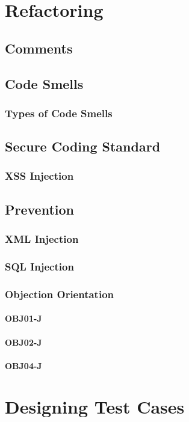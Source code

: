 \documentclass[a4paper]{article}
\begin{document}
\section{Refactoring}
\subsection{Comments}
\subsection{Code Smells}
\subsubsection{Types of Code Smells}
\subsection{Secure Coding Standard}
\subsubsection{XSS Injection}
\subsection{Prevention}
\subsubsection{XML Injection}
\subsubsection{SQL Injection}
\subsubsection{Objection Orientation}
\paragraph{OBJ01-J}
\paragraph{OBJ02-J}
\paragraph{OBJ04-J}
\section{Designing Test Cases}
\end{document}
